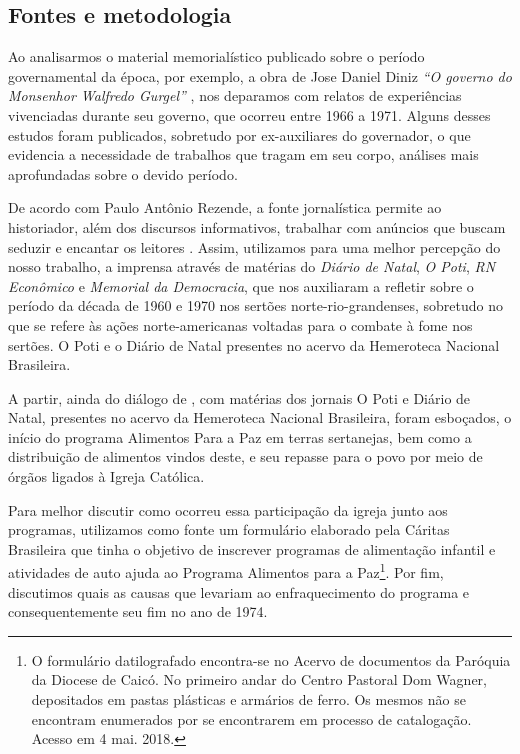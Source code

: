 \begin{refsection}
    \section{Fontes e metodologia}

    Ao analisarmos o material memorialístico publicado sobre o período governamental da época, por exemplo, a obra de Jose Daniel Diniz \textit{``O governo do Monsenhor Walfredo Gurgel''} \citeyear{Diniz2016Governo}, nos deparamos com relatos de experiências vivenciadas durante seu governo, que ocorreu entre 1966 a 1971. Alguns desses estudos foram publicados, sobretudo por ex-auxiliares do governador, o que evidencia a necessidade de trabalhos que tragam em seu corpo, análises mais aprofundadas sobre o devido período. 

    De acordo com Paulo Antônio Rezende, a fonte jornalística permite ao historiador, além dos discursos informativos, trabalhar com anúncios que buscam seduzir e encantar os leitores \cite[p.~62]{Rezende1997Desencantos}. Assim, utilizamos para uma melhor percepção do nosso trabalho, a imprensa através de matérias do \textit{Diário de Natal}, \textit{O Poti}, \textit{RN Econômico} e \textit{Memorial da Democracia}, que nos auxiliaram a refletir sobre o período da década de 1960 e 1970 nos sertões norte-rio-grandenses, sobretudo no que se refere às ações norte-americanas voltadas para o combate à fome nos sertões. O Poti e o Diário de Natal presentes no acervo da Hemeroteca Nacional Brasileira. 

    A partir, ainda do diálogo de \textcite{Neves2012Nordeste}, com matérias dos jornais O Poti e Diário de Natal, presentes no acervo da Hemeroteca Nacional Brasileira, foram esboçados, o início do programa Alimentos Para a Paz em terras sertanejas, bem como a distribuição de alimentos vindos deste, e seu repasse para o povo por meio de órgãos ligados à Igreja Católica.  

    Para melhor discutir como ocorreu essa participação da igreja junto aos programas, utilizamos como fonte um formulário elaborado pela Cáritas Brasileira que tinha o objetivo de inscrever programas de alimentação infantil e atividades de auto ajuda ao Programa Alimentos para a Paz\footnote{O formulário datilografado encontra-se no Acervo de documentos da Paróquia da Diocese de Caicó. No primeiro andar do Centro Pastoral Dom Wagner, depositados em pastas plásticas e armários de ferro. Os mesmos não se encontram enumerados por se encontrarem em processo de catalogação. Acesso em 4 mai. 2018.}. Por fim, discutimos quais as causas que levariam ao enfraquecimento do programa e consequentemente seu fim no ano de 1974.


\end{refsection}
